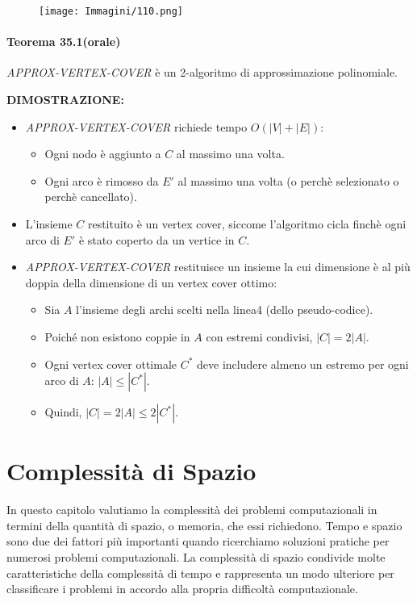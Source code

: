 \documentclass{article}
\begin{document}
\begin{figure}[H]
    \centering
    \texttt{[image: Immagini/110.png]}
    \label{fig:algo-migliorato}
\end{figure}

\paragraph{Teorema 35.1(orale)}
\label{teorema-35.1}
\vspace{1em}
\text{}
\newline
\textit{APPROX-VERTEX-COVER} è un 2-algoritmo di approssimazione polinomiale.

\text{}
\newline
\textbf{DIMOSTRAZIONE:}
\begin{itemize}
    \item \textit{APPROX-VERTEX-COVER} richiede tempo $O(|V| + |E|)$:
    \begin{itemize}
        \item Ogni nodo è aggiunto a $C$ al massimo una volta.
        \item Ogni arco è rimosso da $E'$ al massimo una volta (o perchè selezionato o perchè cancellato).
    \end{itemize}
    \item L’insieme $C$ restituito è un vertex cover, siccome l'algoritmo cicla finchè ogni arco di $E'$ è stato coperto da un vertice in $C$.
    \item \textit{APPROX-VERTEX-COVER} restituisce un insieme la cui dimensione è al più doppia della dimensione di un vertex cover ottimo:
    \begin{itemize}
        \item Sia $A$ l’insieme degli archi scelti nella linea4 (dello pseudo-codice).
        \item Poiché non esistono coppie in $A$ con estremi condivisi, $|C| = 2|A|$.
        \item Ogni vertex cover ottimale $C^*$ deve includere almeno un estremo per ogni arco di $A$: $|A| \leq |C^*|$.
        \item Quindi, $|C| = 2|A| \leq 2|C^*|$.
    \end{itemize}
\end{itemize}

\newpage
\section{Complessità di Spazio}
In questo capitolo valutiamo la complessità dei problemi computazionali in termini della quantità di spazio, o memoria, che essi richiedono.
Tempo e spazio sono due dei fattori più importanti quando ricerchiamo soluzioni pratiche per numerosi problemi computazionali.
La complessità di spazio condivide molte caratteristiche della complessità di tempo e rappresenta un modo ulteriore per classificare i problemi in accordo alla propria difficoltà computazionale.
\end{document}
